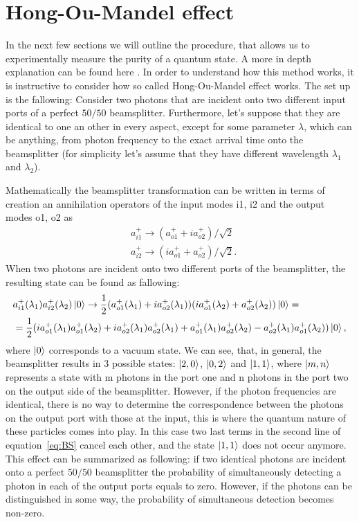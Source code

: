 \section{Hong-Ou-Mandel effect}
In the next few sections we will outline the procedure, that allows us to experimentally measure the purity of a quantum state. A more in depth explanation can be found here \cite{preiss thesis}. In order to understand how this method works, it is instructive to consider how so called Hong-Ou-Mandel effect \cite{HOM} works. The set up is the fallowing: Consider two photons that are incident onto two different input ports of a perfect $50/50$ beamsplitter. Furthermore, let's suppose that they are identical to one an other in every aspect, except for some parameter $\lambda$, which can be anything, from photon frequency to the exact arrival time onto the beamsplitter (for simplicity let's assume that they have different wavelength $\lambda_1$ and $\lambda_2$).

Mathematically the beamsplitter transformation can be written in terms of creation an annihilation operators of the input modes i1, i2 and the output modes o1, o2 as
\begin{equation}
	\begin{aligned}
& a_{i1}^+ \rightarrow (a_{o1}^+ +ia_{o2}^+ )/\sqrt{2} \\
& a_{i2}^+ \rightarrow (ia_{o1}^+ +a_{o2}^+ )/\sqrt{2}.
	\end{aligned}
\end{equation}
When two photons are incident onto two different ports of the beamsplitter, the resulting state can be found as fallowing:
\begin{equation}
\begin{split}
& a_{i1}^+(\lambda_1) a^+_{i2}(\lambda_2) \left|0\right\rangle \rightarrow  \frac{1}{2} (a_{o1}^+(\lambda_1) +ia_{o2}^+(\lambda_1) ) (ia_{o1}^+(\lambda_2) +a_{o2}^+(\lambda_2) )\left|0\right\rangle = \\
&=\frac{1}{2} (i a_{o1}^+(\lambda_1) a_{o1}^+(\lambda_2) + ia_{o2}^+(\lambda_1)a_{o2}^+(\lambda_1) +a_{o1}^+(\lambda_1) a_{o2}^+(\lambda_2) - a_{o2}^+(\lambda_1) a_{o1}^+(\lambda_2))\left|0\right\rangle,
\end{split}
\label{eq:BS}
\end{equation}
where $\left|0\right\rangle$ corresponds to a vacuum state. We can see, that, in general, the beamsplitter results in $3$ possible states: $\left|2,0\right\rangle$, $\left|0,2\right\rangle$ and $\left|1,1\right\rangle$, where $\left|m,n\right\rangle$ represents a state with m photons in the port one and n photons in the port two on the output side of the beamsplitter. However, if the photon frequencies are identical, there is no way to determine the correspondence between the photons on the output port with those at the input, this is where the quantum nature of these particles comes into play. In this case two last terms in the second line of equation~\ref{eq:BS} cancel each other, and the state $\left|1,1\right\rangle$ does not occur anymore. This effect can be summarized as following: if two identical photons are incident onto a perfect $50/50$ beamsplitter the probability of simultaneously detecting a photon in each of the output ports equals to zero. However, if the photons can be distinguished in some way, the probability of simultaneous detection becomes non-zero.

